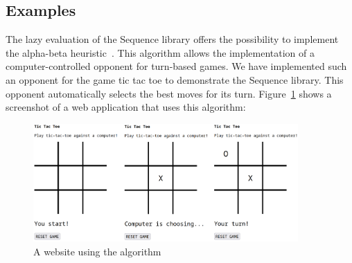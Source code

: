 \subsection*{Examples} %
\label{sub:introduction_Examples}
\thispagestyle{empty}
The lazy evaluation of the Sequence library offers the possibility to implement
the alpha-beta heuristic~\cite[Ch. 5]{hughes_why_1989}. 
This algorithm allows the implementation of a computer-controlled opponent for
turn-based games. We have implemented such an opponent for the game tic tac toe
to demonstrate the Sequence library. This opponent automatically selects the
best moves for its turn. Figure~\ref{img:intro_ttt_playfield} shows a screenshot of a web
application that uses this algorithm:
\begin{figure}[H]
    \centering
    \includegraphics[width=0.9\textwidth]{./mainmatter/pictures/tic-tac-toe-field.png}
    \caption{A website using the algorithm}
    \label{img:intro_ttt_playfield}
\end{figure}

